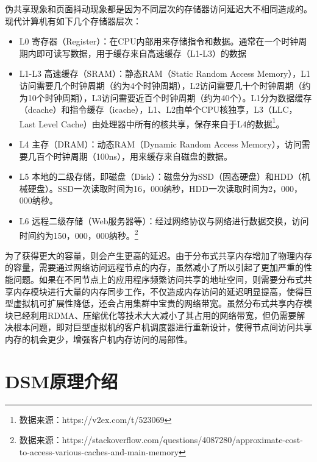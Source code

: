 伪共享现象和页面抖动现象都是因为不同层次的存储器访问延迟大不相同造成的。现代计算机有如下几个存储器层次\cite{csapp}：
\begin{itemize}
  \item L0 寄存器（Register）：在CPU内部用来存储指令和数据。通常在一个时钟周期内即可读写数据，用于缓存来自高速缓存（L1-L3）的数据
  \item L1-L3 高速缓存（SRAM）：静态RAM（Static Random Access Memory），L1访问需要几个时钟周期（约为4个时钟周期），L2访问需要几十个时钟周期（约为10个时钟周期），L3访问需要近百个时钟周期（约为40个）。L1分为数据缓存（dcache）和指令缓存（icache），L1、L2由单个CPU核独享，L3（LLC， Last Level Cache）由处理器中所有的核共享，保存来自于L4的数据\footnote{数据来源：https://v2ex.com/t/523069}。
  \item L4 主存（DRAM）：动态RAM（Dynamic Random Access Memory），访问需要几百个时钟周期（100ns），用来缓存来自磁盘的数据。
  \item L5 本地的二级存储，即磁盘（Disk）：磁盘分为SSD（固态硬盘）和HDD（机械硬盘）。SSD一次读取时间为16，000纳秒，HDD一次读取时间为2，000，000纳秒。
  \item L6 远程二级存储（Web服务器等）：经过网络协议与网络进行数据交换，访问时间约为150，000，000纳秒。\footnote{数据来源：https://stackoverflow.com/questions/4087280/approximate-cost-to-access-various-caches-and-main-memory}
\end{itemize}

为了获得更大的容量，则会产生更高的延迟。由于分布式共享内存增加了物理内存的容量，需要通过网络访问远程节点的内存，虽然减小了所以引起了更加严重的性能问题。如果在不同节点上的应用程序频繁访问共享的地址空间，则需要分布式共享内存模块进行大量的内存同步工作，不仅造成内存访问的延迟明显提高，使得巨型虚拟机可扩展性降低，还会占用集群中宝贵的网络带宽。虽然分布式共享内存模块已经利用RDMA、压缩优化等技术大大减小了其占用的网络带宽，但仍需要解决根本问题，即对巨型虚拟机的客户机调度器进行重新设计，使得节点间访问共享内存的机会更少，增强客户机内存访问的局部性。
\section{DSM原理介绍}



